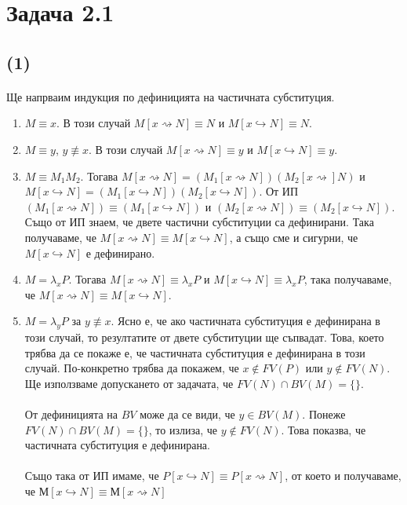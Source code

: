 \documentclass[12pt]{article}
\begin{document}
\section*{Задача 2.1}
\subsection*{(1)}
\paragraph*{}
Ще напрваим индукция по дефиницията на частичната субституция.
\begin{enumerate}
	\item $M \equiv x$. В този случай $M[x \rightsquigarrow N] \equiv N$ и $M[x \hookrightarrow N] \equiv N$.
	\item $M \equiv y$, $y \not\equiv x$. В този случай $M[x \rightsquigarrow N] \equiv y$ и $M[x \hookrightarrow N] \equiv y$.
	\item $M \equiv M_1M_2$. Тогава $M[x \rightsquigarrow N] = (M_1[x \rightsquigarrow N])(M_2[x \rightsquigarrow] N)$ и $M[x \hookrightarrow N] = (M_1[x \hookrightarrow N])(M_2[x \hookrightarrow N])$. От ИП $(M_1[x \rightsquigarrow N]) \equiv (M_1[x \hookrightarrow N])$ и $(M_2[x \rightsquigarrow N]) \equiv (M_2[x \hookrightarrow N])$. Също от ИП знаем, че двете частични субституции са дефинирани. Така получаваме, че $M[x \rightsquigarrow N] \equiv M[x \hookrightarrow N]$, а също сме и сигурни, че $M[x \hookrightarrow N]$ е дефинирано.
	\item $M = \lambda_x P$. Тогава $M[x \rightsquigarrow N] \equiv \lambda_x P$ и $M[x \hookrightarrow N] \equiv \lambda_x P$, така получаваме, че $M[x \rightsquigarrow N] \equiv M[x \hookrightarrow N]$.
	\item $M = \lambda_y P$ за $y \not\equiv x$. Ясно е, че ако частичната субституция е дефинирана в този случай, то резултатите от двете субституции ще съпвадат. Това, което трябва да се покаже е, че частичната субституция е дефинирана в този случай. По-конкретно трябва да покажем, че $x \not\in FV(P)$ или $y \not\in FV(N)$. Ще използваме допускането от задачата, че $FV(N) \cap BV(M) = \{ \}$. 
	\paragraph*{}
	От дефиницията на $BV$ може да се види, че $y \in BV(M)$. Понеже $FV(N) \cap BV(M) = \{ \}$, то излиза, че $y \not\in FV(N)$. Това показва, че частичната субституция е дефинирана.
	\paragraph*{}
	Също така от ИП имаме, че $P[x \hookrightarrow N] \equiv P[x \rightsquigarrow N]$, от което и получаваме, че $М[x \hookrightarrow N] \equiv М[x \rightsquigarrow N]$


\end{enumerate}
\end{document}

